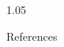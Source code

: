 \documentclass[final]{beamer}
\newlength{\sepwidth}
\newlength{\colwidth}
\newcommand{\separatorcolumn}{%
    \begin{column}{\sepwidth}
    \end{column}
}
\begin{document}
\begin{frame}[t]
\begin{columns}[t]
\begin{column}{1.05\colwidth}
\begin{block}{References}
\end{block}


\end{column}



\separatorcolumn

\end{columns}

\end{frame}
\end{document}
